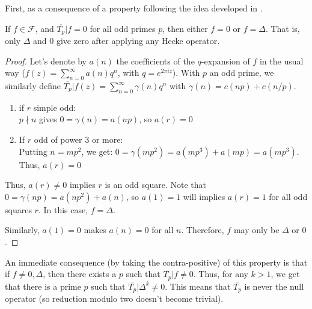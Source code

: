 First, as a consequence of a property following the idea developed in \cite[p.33]{TheWebOfModularityArithmeticOfTheCoefficientsOfModularForms}.
\begin{property}
	If $f \in \mathcal{F}$, and $\overline{T_p}|f = 0$ for all odd primes $p$, then either $f = 0$ or $f = \Delta$.
	That is, only $\Delta$ and $0$ give zero after applying any Hecke operator.
\end{property}
\begin{proof}
	Let's denote by $a(n)$ the coefficients of the $q$-expansion of $f$ in the usual way ($f(z) = \sum_{n=0}^{\infty} a(n)q^n$, with $q=e^{2\pi i z}$).
	With $p$ an odd prime, we similarly define $\overline{T_p}|f(z) = \sum_{n=0}^{\infty} \gamma(n)q^n$ with $\gamma(n) = c(np) + c(n/p)$.
	\begin{enumerate}
		\item if $r$ simple odd:\\
		$p \nmid n$ gives $0 = \gamma(n) = a(np)$,
		so $a(r)=0$
		\item If $r$ odd of power 3 or more:\\
		Putting $n=mp^2$, we get: $0 = \gamma(mp^2) = a(mp^3)+a(mp) = a(mp^3)$.\\
		Thus, $a(r)=0$
	\end{enumerate}
	Thus, $a(r) \neq 0$ implies $r$ is an odd square.
	Note that $0 = \gamma(np) = a(np^2) + a(n)$, so $a(1)=1$ will implies $a(r)=1$ for all odd squares $r$.
	In this case, $f = \Delta$.
	
	Similarly, $a(1)=0$ makes $a(n)=0$ for all $n$.
	Therefore, $f$ may only be $\Delta$ or $0$.
\end{proof}

An immediate consequence (by taking the contra-positive) of this property is that if $f \neq 0, \Delta$, then there exists a $p$ such that $\overline{T_p}|f \neq 0$.
Thus, for any $k > 1$, we get that there is a prime $p$ such that $\overline{T_p}|\Delta^k \neq 0$.
This means that $\overline{T_p}$ is never the null operator (so reduction modulo two doesn't become trivial).



